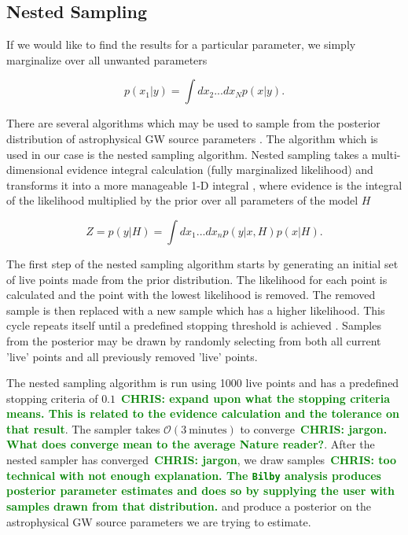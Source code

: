 \documentclass[%
showpacs,
 amsmath,amssymb,
 aps,
 twocolumn,
 prl,
 reprint,
floatfix,
]{revtex4-1}
\newcommand{\chris}[1]{\textbf{\textcolor{green}{CHRIS: #1}}}
\begin{document}
\subsection{Nested Sampling}
%
%
If we would like to find the results for a particular parameter, 
we simply marginalize over all unwanted parameters 

\begin{equation}
    p(x_1|y) = \int dx_2 ... dx_N p(x|y).
\end{equation}

There are several algorithms which may be used to sample from the posterior
distribution of astrophysical GW source parameters \cite{PhysRevD.64.022001,
skilling2006,10.1111/j.1365-2966.2011.20288.x}. The
algorithm which is used in our case is the nested sampling algorithm. Nested
sampling takes a multi-dimensional evidence integral calculation (fully
marginalized likelihood) and transforms it into a more manageable 1-D integral
, where evidence is the integral of the likelihood 
multiplied by the prior over all parameters of the model $H$ ~\cite{1409.7215}

\begin{equation}
    Z = p(y|H) = \int dx_1 ... dx_n p(y|x,H)p(x|H).\label{eq:evidence}
\end{equation}

%
%
The first step of the nested sampling algorithm starts by generating an initial
set of live points made from the prior distribution. The likelihood for each
point is calculated and the point with the lowest likelihood is removed. The
removed sample is then replaced with a new sample which has a higher
likelihood. This cycle repeats itself until a predefined stopping threshold is
achieved \cite{1409.7215} . Samples from the posterior may be drawn by randomly
selecting from both all current 'live' points and all previously removed 'live'
points.

The nested sampling algorithm is run using
1000 live points and has a predefined stopping criteria of $0.1$~\chris{expand
upon what the stopping criteria means. This is related to the evidence
calculation and the tolerance on that result}. The sampler takes $\mathcal{O}(3
\: \textrm{minutes})$ to converge~\chris{jargon. What does converge mean to the
average Nature reader?}. After the nested sampler has converged~\chris{jargon}, we draw
samples~\chris{too technical with not enough explanation. The \texttt{Bilby} analysis
produces posterior parameter estimates and does so by supplying the user with
samples drawn from that distribution.} and produce a posterior on the
astrophysical \ac{GW} source parameters we are trying to estimate.
\end{document}
